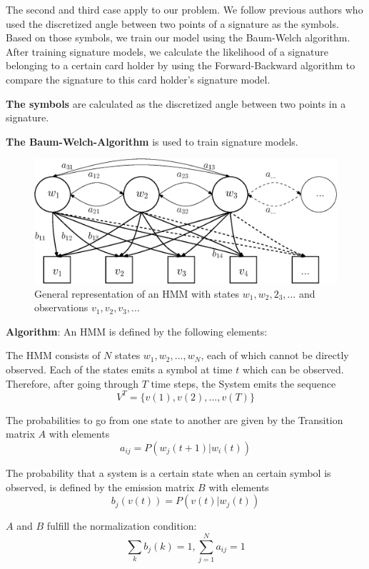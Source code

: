 \documentclass[a4paper, oneside]{csthesis}
\begin{document}
The second and third case apply to our problem. We follow previous authors who used the discretized angle between two points of a signature as the symbols. Based on those symbols, we train our model using the Baum-Welch algorithm. After training signature models, we calculate the likelihood of a signature belonging to a certain card holder by using the Forward-Backward algorithm to compare the signature to this card holder's signature model.


\textbf{The symbols} are calculated as the discretized angle between two points in a signature.


\textbf{The Baum-Welch-Algorithm} is used to train signature models.

\begin{figure}[tb]
    \begin{center}
        \includegraphics[width=\textwidth]{figures/hmm-general-model.eps}
    \end{center}
    \caption{General representation of an HMM with states $w_1, w_2, 2_3, ...$ and observations $v_1, v_2, v_3, ...$}
    \label{fig:hmm-general-model}
\end{figure}

\textbf{Algorithm}: An HMM is defined by the following elements:

The HMM consists of $N$ states $w_1, w_2, ..., w_N$, each of which cannot be directly observed. Each of the states emits a symbol at time $t$ which can be observed. Therefore, after going through $T$ time steps, the System emits the sequence $$V^T = \{ v(1), v(2), ..., v(T)\}$$

The probabilities to go from one state to another are given by the Transition matrix $A$ with elements $$a_{ij} = P(w_j(t+1)|w_i(t))$$

The probability that a system is a certain state when an certain symbol is observed, is defined by the emission matrix $B$ with elements
$$b_j(v(t)) = P(v(t)|w_j(t))$$

$A$ and $B$ fulfill the normalization condition:
$$\sum_k b_j(k) = 1, \sum_{j=1}^{N} a_{ij} = 1$$
\end{document}
